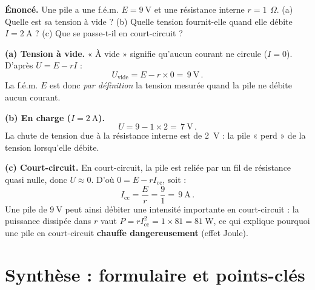 \documentclass[11pt,a4paper]{article}
\newcommand{\ohm}{\,\Omega}
\begin{document}
\begin{exemple}
\textbf{Énoncé.} Une pile a une f.é.m. $E=\SI{9}{\volt}$ et une résistance interne $r=\SI{1}{\ohm}$.
(a) Quelle est sa tension à vide ? (b) Quelle tension fournit-elle quand elle débite $I=\SI{2}{\ampere}$ ?
(c) Que se passe-t-il en court-circuit ?

\smallskip
\textbf{(a) Tension à vide.} « À vide » signifie qu'aucun courant ne circule ($I=0$). D'après $U=E-rI$ :
\[ U_{\mathrm{vide}} = E - r\times 0 = \boxed{\,\SI{9}{\volt}\,}. \]
La f.é.m. $E$ est donc \emph{par définition} la tension mesurée quand la pile ne débite aucun courant.

\textbf{(b) En charge ($I=\SI{2}{\ampere}$).}
\[ U = 9 - 1\times 2 = \boxed{\,\SI{7}{\volt}\,}. \]
La chute de tension due à la résistance interne est de \SI{2}{\volt} : la pile « perd » de la tension
lorsqu'elle débite.

\textbf{(c) Court-circuit.} En court-circuit, la pile est reliée par un fil de résistance quasi nulle,
donc $U\approx 0$. D'où $0=E-rI_{\mathrm{cc}}$, soit :
\[ I_{\mathrm{cc}} = \frac{E}{r} = \frac{9}{1} = \boxed{\,\SI{9}{\ampere}\,}. \]
Une pile de $\SI{9}{\volt}$ peut ainsi débiter une intensité importante en court-circuit : la puissance
dissipée dans $r$ vaut $P=rI_{\mathrm{cc}}^2=1\times 81=\SI{81}{\watt}$, ce qui explique pourquoi une
pile en court-circuit \textbf{chauffe dangereusement} (effet Joule).
\end{exemple}

\section{Synthèse : formulaire et points-clés}
\end{document}
